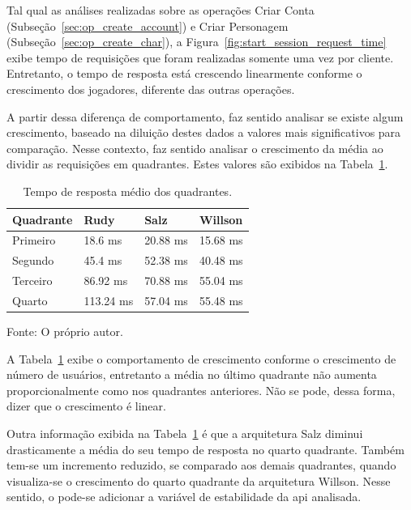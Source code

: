 Tal qual as análises realizadas sobre as operações Criar Conta (Subseção~\ref{sec:op_create_account}) e Criar Personagem (Subseção~\ref{sec:op_create_char}), a Figura~\ref{fig:start_session_request_time} exibe tempo de requisições que foram realizadas somente uma vez por cliente.
%
Entretanto, o tempo de resposta está crescendo linearmente conforme o crescimento dos jogadores, diferente das outras operações.

A partir dessa diferença de comportamento, faz sentido analisar se existe algum crescimento, baseado na diluição destes dados a valores mais significativos para comparação.
%
Nesse contexto, faz sentido analisar o crescimento da média ao dividir as requisições em quadrantes.
%
Estes valores são exibidos na Tabela~\ref{tab:op_start_session}.

\begin{table}[htb!]
\centering
\begin{adjustbox}{max width=\textwidth}
\caption{Tempo de resposta médio dos quadrantes.}
\label{tab:op_start_session}
\begin{tabular}{l|l|l|l}

\hline \hline

Quadrante & Rudy    & Salz    & Willson \\ \hline \hline

Primeiro  & 18.6 ms & 20.88 ms & 15.68 ms \\ \hline

Segundo   & 45.4 ms & 52.38 ms & 40.48 ms \\ \hline

Terceiro  & 86.92 ms & 70.88 ms & 55.04 ms \\ \hline

Quarto    & 113.24 ms & 57.04 ms & 55.48 ms \\ \hline \hline

\end{tabular}

\end{adjustbox}

Fonte: O próprio autor.
\end{table}

A Tabela~\ref{tab:op_start_session} exibe o comportamento de crescimento conforme o crescimento de número de usuários, entretanto a média no último quadrante não aumenta proporcionalmente como nos quadrantes anteriores.
%
Não se pode, dessa forma, dizer que o crescimento é linear.

Outra informação exibida na Tabela~\ref{tab:op_start_session} é que a arquitetura Salz diminui drasticamente a média do seu tempo de resposta no quarto quadrante.
%
Também tem-se um incremento reduzido, se comparado aos demais quadrantes, quando visualiza-se o crescimento do quarto quadrante da arquitetura Willson.
%
Nesse sentido, o pode-se adicionar a variável de estabilidade da \ac{api} analisada.

